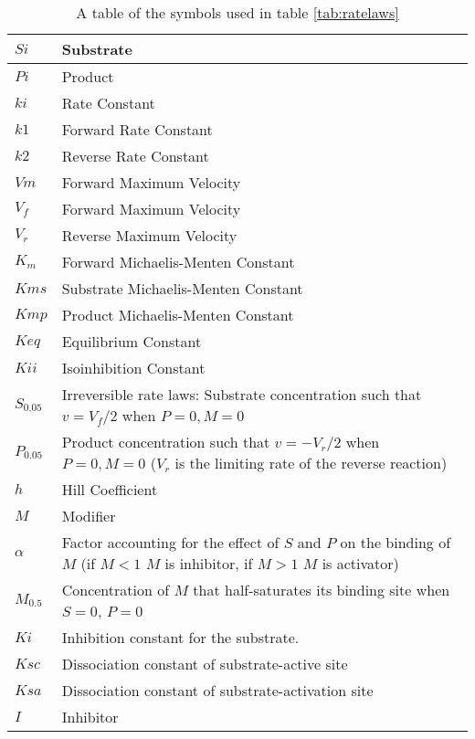 \documentclass[10pt]{article}
\begin{document}
\begin{table}[h]
\begin{tabular}{|p{2cm}|p{14cm}|}
\hline
$Si$&  Substrate \\ \hline
$Pi$&  Product \\ \hline
$ki$&  Rate Constant \\ \hline
$k1$&  Forward Rate Constant \\ \hline
$k2$&  Reverse Rate Constant \\ \hline
$Vm$&  Forward Maximum Velocity \\ \hline
$V_f $& Forward Maximum Velocity \\ \hline
$V_r $& Reverse Maximum Velocity \\ \hline
$K_m $& Forward Michaelis-Menten Constant \\ \hline
$Kms$& Substrate Michaelis-Menten Constant \\ \hline
$Kmp$& Product Michaelis-Menten Constant \\ \hline
$Keq$& Equilibrium Constant \\ \hline
$Kii$& Isoinhibition Constant \\ \hline
$S_{0.05}$& Irreversible rate laws: Substrate concentration such that $v = V_f/2$ when $P = 0, M=0$ \\ \hline
$P_{0.05}$&Product concentration such that $v = - V_r/2$ when $P = 0, M=0$ ($V_r$ is the limiting rate of the reverse reaction) \\ \hline
$h$&  Hill Coefficient \\ \hline
$M$&   Modifier \\ \hline
$\alpha $&  Factor accounting for the effect of $S$ and $P$ on the binding of $M$ (if $M<1$ $M$ is inhibitor, if $M>1$ $M$ is activator) \\ \hline
$M_{0.5}$& Concentration of $M$ that half-saturates its binding site when $S = 0$, $P=0$ \\ \hline
$Ki   $&         Inhibition constant for the substrate. \\ \hline
$Ksc  $&      Dissociation constant of substrate-active site \\ \hline
$Ksa   $&     Dissociation constant of substrate-activation site \\ \hline
$I     $&         Inhibitor \\ \hline
\end{tabular}
\caption{A table of the symbols used in table \ref{tab:ratelaws} }
\end{table}
\addtocounter{table}{-1}
\end{document}
